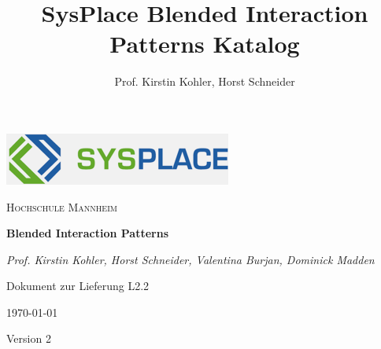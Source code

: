 \documentclass[12pt,a4paper]{article}
\author{Prof. Kirstin Kohler, Horst Schneider}
\title{SysPlace Blended Interaction Patterns Katalog}
\begin{document}
\begin{titlepage}
\centering
\includegraphics[scale=1]{sysplace_logo.png}\par\vspace{1.5cm}
{\scshape\Large Hochschule Mannheim \par}
\vspace{1cm}
{\huge\bfseries Blended Interaction Patterns\par}
\vspace{2.5cm}
{\Large\itshape Prof. Kirstin Kohler, Horst Schneider, Valentina Burjan, Dominick Madden\par}
\vspace{1cm}
{\large Dokument zur Lieferung L2.2}
\vfill
{\large \today\par}
\vspace{1cm}
{\large Version 2}
\end{titlepage}

\pagebreak
\tableofcontents
\end{document}
